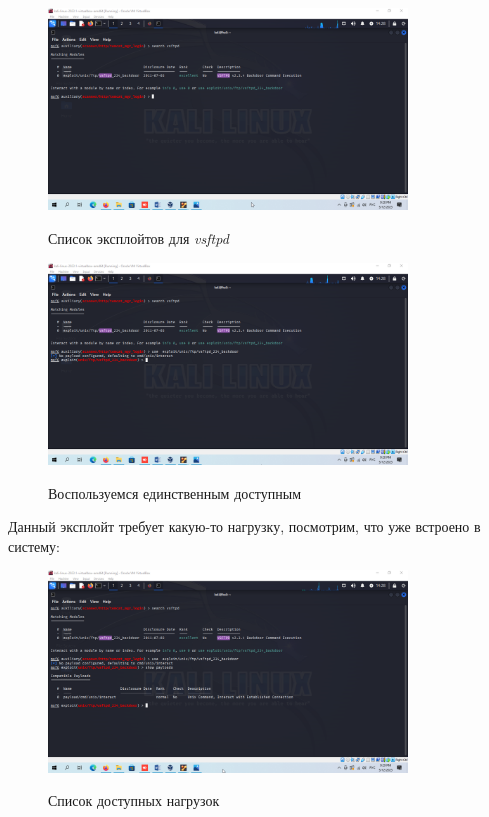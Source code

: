 \documentclass[a4paper]{article}
\begin{document}
  \begin{figure}[H]
    \centering
    \includegraphics[width=0.85\textwidth]{04_0060}
    \label{img:60}
    \caption{Список эксплойтов для \textit{vsftpd}}
  \end{figure}

  \begin{figure}[H]
    \centering
    \includegraphics[width=0.85\textwidth]{04_0061}
    \label{img:61}
    \caption{Воспользуемся единственным доступным}
  \end{figure}

  Данный эксплойт требует какую-то нагрузку, посмотрим, что уже встроено в систему:

  \begin{figure}[H]
    \centering
    \includegraphics[width=0.85\textwidth]{04_0062}
    \label{img:62}
    \caption{Список доступных нагрузок}
  \end{figure}
\end{document}
